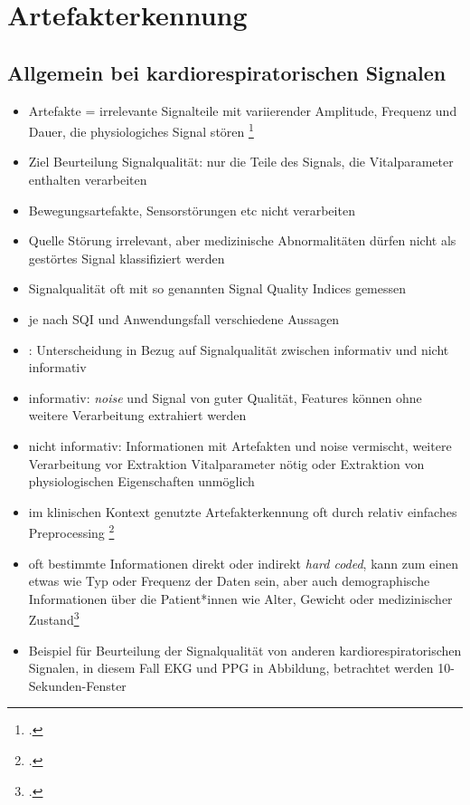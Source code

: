 \section{Artefakterkennung}

	\subsection{Allgemein bei kardiorespiratorischen Signalen}

	\begin{itemize}
		\item Artefakte = irrelevante Signalteile mit variierender Amplitude, Frequenz und Dauer, die physiologiches Signal stören \footcite{Nizami2013}
		\item Ziel Beurteilung Signalqualität: nur die Teile des Signals, die Vitalparameter enthalten verarbeiten
		\item Bewegungsartefakte, Sensorstörungen etc nicht verarbeiten
		\item Quelle Störung irrelevant, aber medizinische Abnormalitäten dürfen nicht als gestörtes Signal klassifiziert werden
		\item Signalqualität oft mit so genannten Signal Quality Indices gemessen
		\item je nach SQI und Anwendungsfall verschiedene Aussagen
		\item \citeauthor{Sadek2016}: Unterscheidung in Bezug auf Signalqualität zwischen informativ und nicht informativ
		\item informativ: \textit{noise} und Signal von guter Qualität, Features können ohne weitere Verarbeitung extrahiert werden
		\item nicht informativ: Informationen mit Artefakten und noise vermischt, weitere Verarbeitung vor Extraktion Vitalparameter nötig oder Extraktion von physiologischen Eigenschaften unmöglich
		\item im klinischen Kontext genutzte Artefakterkennung oft durch relativ einfaches Preprocessing \footcite[Vgl.][]{Nizami2013}
		\item oft bestimmte Informationen direkt oder indirekt \textit{hard coded}, kann zum einen etwas wie Typ oder Frequenz der Daten sein, aber auch demographische Informationen über die Patient*innen wie Alter, Gewicht oder medizinischer Zustand\footcite[Vgl.][]{Nizami2013}
		\item Beispiel für Beurteilung der Signalqualität von anderen kardiorespiratorischen Signalen, in diesem Fall \ac{EKG} und \ac{PPG} in Abbildung, betrachtet werden 10-Sekunden-Fenster %
	\end{itemize}
	
